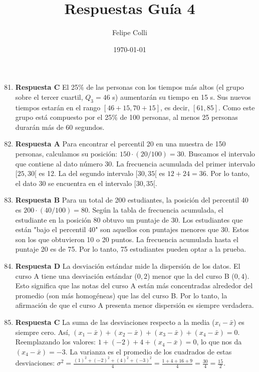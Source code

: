 \documentclass[11pt]{article}
\title{Respuestas Guía 4}
\author{Felipe Colli}
\date{\today}
\begin{document}
\maketitle

\begin{enumerate}
\setcounter{enumi}{80}

\section{Respuestas 81-100}

    \item \textbf{Respuesta C} El 25\% de las personas con los tiempos más altos (el grupo sobre el tercer cuartil, $Q_3=46$ s) aumentarán su tiempo en 15 s. Sus nuevos tiempos estarán en el rango $[46+15, 70+15]$, es decir, $[61, 85]$. Como este grupo está compuesto por el 25\% de 100 personas, al menos 25 personas durarán más de 60 segundos. %
    
    \item \textbf{Respuesta A} Para encontrar el percentil 20 en una muestra de 150 personas, calculamos su posición: $150 \cdot (20/100) = 30$. Buscamos el intervalo que contiene al dato número 30. La frecuencia acumulada del primer intervalo $[25, 30[$ es 12. La del segundo intervalo $[30, 35[$ es $12 + 24 = 36$. Por lo tanto, el dato 30 se encuentra en el intervalo $[30, 35[$. %
    
    \item \textbf{Respuesta B} Para un total de 200 estudiantes, la posición del percentil 40 es $200 \cdot (40/100) = 80$. Según la tabla de frecuencia acumulada, el estudiante en la posición 80 obtuvo un puntaje de 30. Los estudiantes que están "bajo el percentil 40" son aquellos con puntajes menores que 30. Estos son los que obtuvieron 10 o 20 puntos. La frecuencia acumulada hasta el puntaje 20 es de 75. Por lo tanto, 75 estudiantes pueden optar a la prueba. %

    \item \textbf{Respuesta D} La desviación estándar mide la dispersión de los datos. El curso A tiene una desviación estándar ($0,2$) menor que la del curso B ($0,4$). Esto significa que las notas del curso A están más concentradas alrededor del promedio (son más homogéneas) que las del curso B. Por lo tanto, la afirmación de que el curso A presenta menor dispersión es siempre verdadera. %

    \item \textbf{Respuesta C} La suma de las desviaciones respecto a la media ($x_i - \bar{x}$) es siempre cero. Así, $(x_1-\bar{x})+(x_2-\bar{x})+(x_3-\bar{x})+(x_4-\bar{x}) = 0$. Reemplazando los valores: $1 + (-2) + 4 + (x_4 - \bar{x}) = 0$, lo que nos da $(x_4 - \bar{x}) = -3$. La varianza es el promedio de los cuadrados de estas desviaciones: $\sigma^2 = \frac{(1)^2+(-2)^2+(4)^2+(-3)^2}{4} = \frac{1+4+16+9}{4} = \frac{30}{4} = \frac{15}{2}$. %
    

\end{enumerate}
\end{document}
